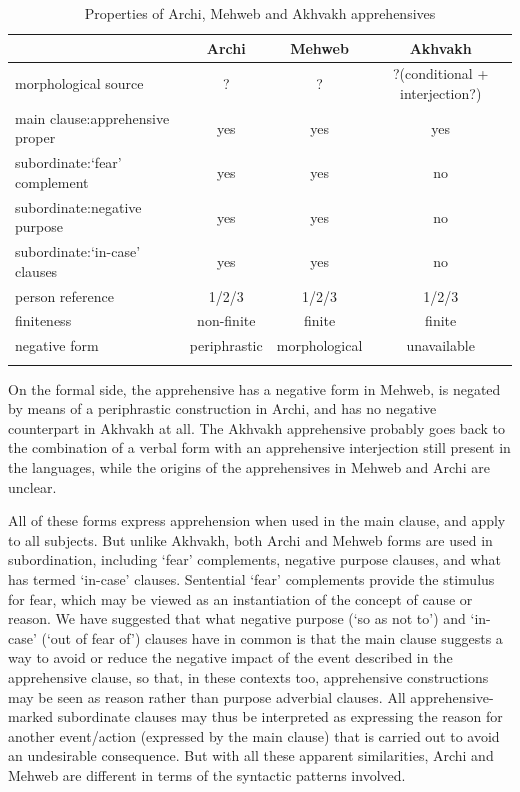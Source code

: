 \documentclass[output=paper,colorlinks,citecolor=brown]{langscibook}
\begin{document}
\begin{table}[h]

\caption{Properties of Archi, Mehweb and Akhvakh apprehensives}
\label{tab:summary}
\begin{tabularx}{\textwidth}{QccC}
\lsptoprule
\textbf{} & \textbf{Archi} & \textbf{Mehweb} & \textbf{Akhvakh} \\
\midrule
morphological source & ? & ? & ?\newline (conditional + interjection?) \\
\tablevspace
main clause:\newline apprehensive proper & yes & yes & yes \\
\tablevspace
subordinate:\newline `fear' complement & yes & yes & no \\
\tablevspace
subordinate:\newline negative purpose & yes & yes & no \\
\tablevspace
subordinate:\newline `in-case' clauses & yes & yes & no \\
\tablevspace
person reference & 1/2/3 & 1/2/3 & 1/2/3 \\
\tablevspace
finiteness & non-finite & finite & finite \\
\tablevspace
negative form & periphrastic & morphological & unavailable \\
\lspbottomrule
\end{tabularx}
\end{table}

 
\noindent On the formal side, the apprehensive has a negative form in Mehweb, is negated by means of a periphrastic construction in Archi, and has no negative counterpart in Akhvakh at all. The Akhvakh apprehensive probably goes back to the combination of a verbal form with an apprehensive interjection still present in the languages, while the origins of the apprehensives in Mehweb and Archi are unclear. 

All of these forms express apprehension when used in the main clause, and apply to all subjects. But unlike Akhvakh, both Archi and Mehweb forms are used in subordination, including `fear' complements, negative purpose clauses, and what \citet{lichtenberk1995} has termed `in-case' clauses. Sentential `fear' complements provide the stimulus for fear, which may be viewed as an instantiation of the concept of cause or reason. We have suggested that what negative purpose (`so as not to') and `in-case' (`out of fear of') clauses have in common is that the main clause suggests a way to avoid or reduce the negative impact of the event described in the apprehensive clause, so that, in these contexts too, apprehensive constructions may be seen as reason rather than purpose adverbial clauses. All apprehensive-marked subordinate clauses may thus be interpreted as expressing the reason for another event/action (expressed by the main clause) that is carried out to avoid an undesirable consequence. But with all these apparent similarities, Archi and Mehweb are different in terms of the syntactic patterns involved. 
\end{document}
